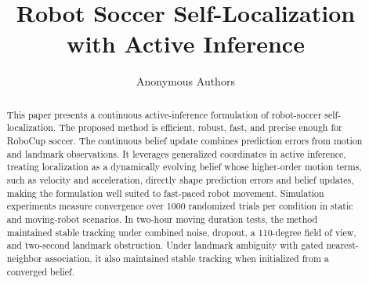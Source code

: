 \documentclass[runningheads]{llncs}
\begin{document}
\title{Robot Soccer Self-Localization with Active Inference}

\author{Anonymous Authors}

\maketitle
\begingroup
\renewcommand{\thefootnote}{\fnsymbol{footnote}}
\endgroup

\begin{abstract}
This paper presents a continuous active-inference formulation of robot-soccer self-localization. The proposed method is efficient, robust, fast, and precise enough for RoboCup soccer. The continuous belief update combines prediction errors from motion and landmark observations. It leverages generalized coordinates in active inference, treating localization as a dynamically evolving belief whose higher-order motion terms, such as velocity and acceleration, directly shape prediction errors and belief updates, making the formulation well suited to fast-paced robot movement. Simulation experiments measure convergence over 1000 randomized trials per condition in static and moving-robot scenarios. In two-hour moving duration tests, the method maintained stable tracking under combined noise, dropout, a 110-degree field of view, and two-second landmark obstruction. Under landmark ambiguity with gated nearest-neighbor association, it also maintained stable tracking when initialized from a converged belief.
\end{abstract}












\clearpage

\end{document}
